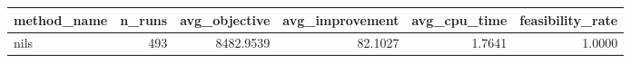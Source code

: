 \begin{tabular}{lrrrrr}
\toprule
method_name & n_runs & avg_objective & avg_improvement & avg_cpu_time & feasibility_rate \\
\midrule
nils & 493 & 8482.9539 & 82.1027 & 1.7641 & 1.0000 \\
\bottomrule
\end{tabular}
